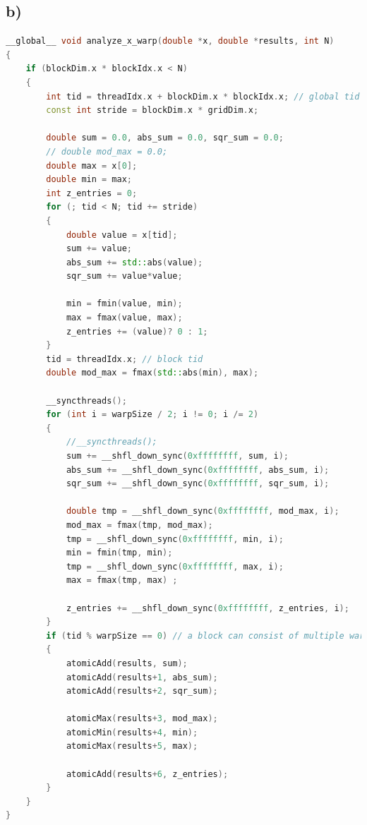 \documentclass[11pt,a4paper]{article}
\begin{document}
\subsection*{b)}
\begin{lstlisting}[language=C++, caption={kernel for warp shuffeld}]
__global__ void analyze_x_warp(double *x, double *results, int N) 
{
	if (blockDim.x * blockIdx.x < N) 
	{
		int tid = threadIdx.x + blockDim.x * blockIdx.x; // global tid
		const int stride = blockDim.x * gridDim.x;
	
		double sum = 0.0, abs_sum = 0.0, sqr_sum = 0.0;
		// double mod_max = 0.0;
		double max = x[0];
		double min = max;
		int z_entries = 0;
		for (; tid < N; tid += stride) 
		{
			double value = x[tid];
			sum += value;
			abs_sum += std::abs(value);
			sqr_sum += value*value;
			
			min = fmin(value, min); 
			max = fmax(value, max);
			z_entries += (value)? 0 : 1;
		}
		tid = threadIdx.x; // block tid 
		double mod_max = fmax(std::abs(min), max);

		__syncthreads();
		for (int i = warpSize / 2; i != 0; i /= 2) 
		{
			//__syncthreads();
			sum += __shfl_down_sync(0xffffffff, sum, i);
			abs_sum += __shfl_down_sync(0xffffffff, abs_sum, i);
			sqr_sum += __shfl_down_sync(0xffffffff, sqr_sum, i);
			
			double tmp = __shfl_down_sync(0xffffffff, mod_max, i);
			mod_max = fmax(tmp, mod_max);
			tmp = __shfl_down_sync(0xffffffff, min, i);
			min = fmin(tmp, min);
			tmp = __shfl_down_sync(0xffffffff, max, i);
			max = fmax(tmp, max) ;
			
			z_entries += __shfl_down_sync(0xffffffff, z_entries, i);
		}  
		if (tid % warpSize == 0) // a block can consist of multiple warps
		{
			atomicAdd(results, sum);
			atomicAdd(results+1, abs_sum);
			atomicAdd(results+2, sqr_sum);
			
			atomicMax(results+3, mod_max);
			atomicMin(results+4, min);
			atomicMax(results+5, max);
			
			atomicAdd(results+6, z_entries);
		}
	}
}
\end{lstlisting}
\end{document}
